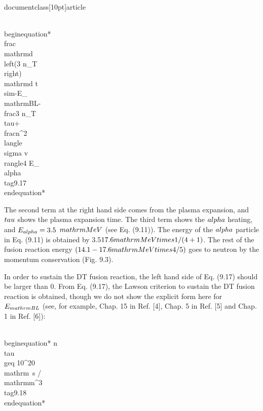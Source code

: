 \\documentclass[10pt]{article}
\begin{document}
{{{{{{\\begin{equation*}
\\frac{\\mathrm{d}\\left(3 n_{T}\\right)}{\\mathrm{d} t} \\sim-E_{\\mathrm{BL}}-\\frac{3 n_{T}}{\\tau}+\\frac{n^{2}\\langle\\sigma v\\rangle}{4} E_{\\alpha} \\tag{9.17}
\\end{equation*}


The second term at the right hand side comes from the plasma expansion, and $\\tau$ shows the plasma expansion time. The third term shows the $\\alpha$ heating, and $E_{\\alpha}=3.5$ $\\mathrm{MeV}$ (see Eq. (9.11)). The energy of the $\\alpha$ particle in Eq. (9.11) is obtained by 3.5$17.6 \\mathrm{MeV} \\times 1 /(4+1)$. The rest of the fusion reaction energy $(14.1-17.6 \\mathrm{MeV} \\times 4 / 5)$ goes to neutron by the momentum conservation (Fig. 9.3).

In order to sustain the DT fusion reaction, the left hand side of Eq. (9.17) should be larger than 0. From Eq. (9.17), the Lawson criterion to sustain the DT fusion reaction is obtained, though we do not show the explicit form here for $E_{\\mathrm{BL}}$ (see, for example, Chap. 15 in Ref. [4], Chap. 5 in Ref. [5] and Chap. 1 in Ref. [6]):


\\begin{equation*}
n \\tau \\geq 10^{20} \\mathrm{~s} / \\mathrm{m}^{3} \\tag{9.18}
\\end{equation*}


}}}}}}
\end{document}
